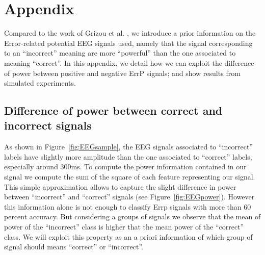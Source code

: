 
\section{Appendix}
\label{sec:appendix}

Compared to the work of Grizou et al. \cite{grizou2014interactive}, we introduce a prior information on the Error-related potential EEG signals used, namely that the signal corresponding to an ``incorrect'' meaning are more ``powerful'' than the one associated to meaning ``correct''. In this appendix, we detail how we can exploit the difference of power between positive and negative ErrP signals; and show results from simulated experiments.

\subsection{Difference of power between correct and incorrect signals}

As shown in Figure~\ref{fig:EEGsample}, the EEG signals associated to ``incorrect'' labels have slightly more amplitude than the one associated to ``correct'' labels, especially around 300ms. To compute the power information contained in our signal we compute the sum of the square of each feature representing our signal. This simple approximation allows to capture the slight difference in power between ``incorrect'' and ``correct'' signals (see Figure~\ref{fig:EEGpower}). However this information alone is not enough to classify Errp signals with more than 60 percent accuracy. But considering a groups of signals we observe that the mean of power of the ``incorrect'' class is higher that the mean power of the ``correct'' class. We will exploit this property as an a priori information of which group of signal should means ``correct'' or ``incorrect''.

